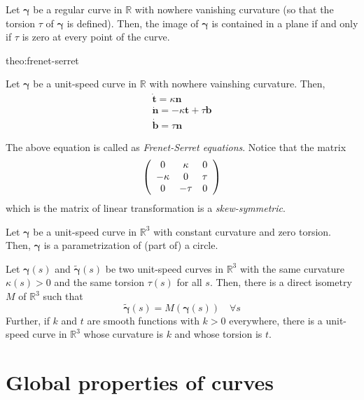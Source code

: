 \documentclass{notes}
\begin{document}
\begin{proposition}{1}
	Let \(\bm{\gamma}\)  be a regular curve in \(\mathbb{R}\) with nowhere vanishing curvature (so that the
	torsion \(\tau\) of \(\bm{\gamma}\) is defined). Then, the image of \(\bm{\gamma}\) is contained in a plane if and
	only if \(\tau\) is zero at every point of the curve.
\end{proposition}
\begin{theorem}{theo:frenet-serret}
	
	Let \(\bm{\gamma}\) be a unit-speed curve in \(\mathbb{R}\) with nowhere vainshing curvature. Then, 
	\[
	\begin{gathered}
		\mathbf{\dot{t}} = \kappa \mathbf{n}\\
		\mathbf{\dot{n}} = -\kappa \mathbf{t} + \tau \mathbf{b}\\
		\mathbf{\dot{b}} = \tau \mathbf{n}
	\end{gathered}
	\]
	
	The above equation is called as \textit{Frenet-Serret equations}. Notice that the matrix
	\[
	\left(
	\begin{array}{c c c}
		0 & \kappa & 0 \\
		-\kappa & 0 & \tau\\
		0 & -\tau & 0 
	\end{array}
	\right)
	\]
	which is the matrix of linear transformation is a \textit{skew-symmetric}.
\end{theorem}

\begin{proposition}{1}
	Let \(\bm{\gamma}\) be a unit-speed curve in \(\mathbb{R}^3\) with constant curvature and zero torsion.
	Then, \(\bm{\gamma}\) is a parametrization of (part of) a circle.
\end{proposition}

\begin{theorem}{1}
	Let \(\bm{\gamma}(s)\) and \(\tilde{\bm{\gamma}}(s)\) be two unit-speed curves in \(\mathbb{R}^3\) with the same curvature
	\(\kappa(s) >0 \) and the same torsion \(\tau(s)\) for all \(s\). Then, there is a direct isometry
	\(M\) of \(\mathbb{R}^3\) such that
\[\tilde{\bm{\gamma}}(s) = M(\bm{\gamma}(s)) \quad \forall s\]
	Further, if \(k\) and \(t\) are smooth functions with \(k > 0\) everywhere, there is a
	unit-speed curve in \(\mathbb{R}^3\) whose curvature is \(k\) and whose torsion is \(t\).
\end{theorem}

\chapter{Global properties of curves}
\end{document}
